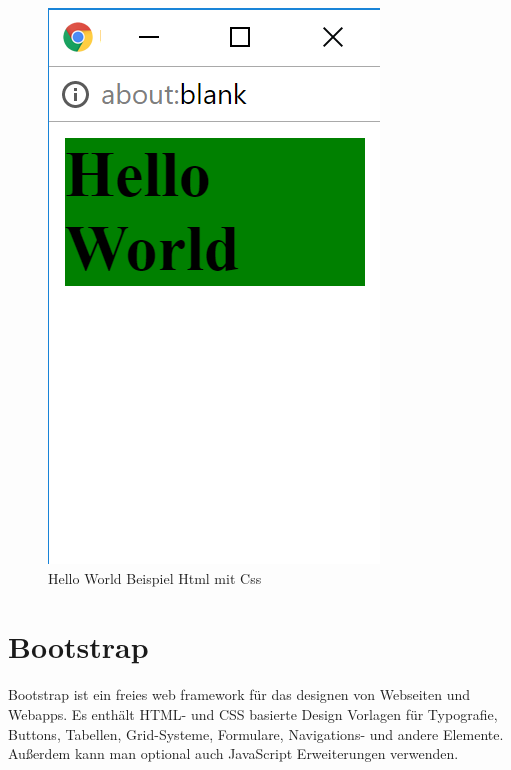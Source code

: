 \begin{figure}[H]
\begin{center}
	\includegraphics[scale=.6]{images/media.png}
\end{center}
	\caption{Hello World Beispiel Html mit Css}
	\label{fig:sample}
\end{figure}

\section{Bootstrap}
Bootstrap ist ein freies web framework für das designen von Webseiten und Webapps. Es enthält HTML- und CSS basierte Design Vorlagen für Typografie, Buttons, Tabellen, Grid-Systeme, Formulare, Navigations- und andere Elemente. Außerdem kann man optional auch JavaScript Erweiterungen verwenden.


